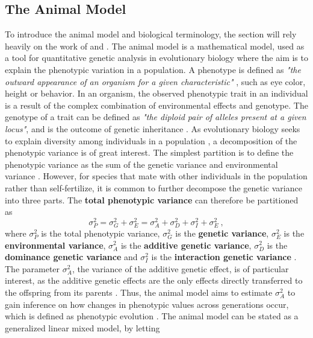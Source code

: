 \subsection*{The Animal Model}
To introduce the animal model and biological terminology, the section will rely heavily on the work of \citet{Kruuk2004} and \citet{ConnerHartl2004}. 
The animal model is a mathematical model, used as a tool for quantitative genetic analysis in evolutionary biology where the aim is to explain the phenotypic variation in a population.
A phenotype is defined as \textit{"the outward appearance of an organism for a given characteristic"} \citep{ConnerHartl2004}, such as eye color, height or behavior. 
In an organism, the observed phenotypic trait in an individual is a result of the complex combination of environmental effects and genotype. 
The genotype of a trait can be defined as \textit{"the diploid pair of alleles present at a given locus"}, and is the outcome of genetic inheritance \citep{ConnerHartl2004}. 
As evolutionary biology seeks to explain diversity among individuals in a population \citep{Kruuk2004}, a decomposition of the phenotypic variance is of great interest. 
The simplest partition is to define the phenotypic variance as the sum of the genetic variance and environmental variance \citep{ConnerHartl2004}. 
However, for species that mate with other individuals in the population rather than self-fertilize, it is common to further decompose the genetic variance into three parts. 
The \textbf{total phenotypic variance} can therefore be partitioned as
\begin{equation}
    \sigma^2_P = \sigma^2_G + \sigma^2_E = \sigma^2_A + \sigma^2_D + \sigma^2_I + \sigma^2_E \ ,
\end{equation}
where $\sigma^2_P$ is the total phenotypic variance, $\sigma^2_G$ is the \textbf{genetic variance}, $\sigma^2_E$ is the \textbf{environmental variance}, $\sigma^2_A$ is the \textbf{additive genetic variance}, $\sigma^2_D$ is the \textbf{dominance genetic variance} and $\sigma^2_I$ is the \textbf{interaction genetic variance} \citep{ConnerHartl2004}.
The parameter $\sigma^2_A$, the variance of the additive genetic effect, is of particular interest, as the additive genetic effects are the only effects directly transferred to the offspring from its parents \citep{ConnerHartl2004}.
Thus, the animal model aims to estimate $\sigma^2_A$ to gain inference on how changes in phenotypic values across generations occur, which is defined as phenotypic evolution \citep{ConnerHartl2004}.
The animal model can be stated as a generalized linear mixed model, by letting 
